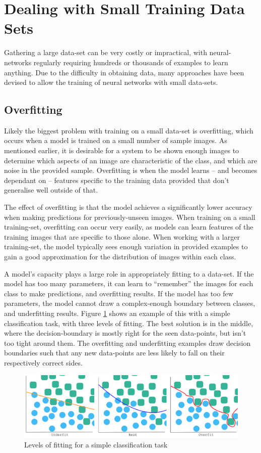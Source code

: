 \documentclass{report}
\begin{document}
	\section{Dealing with Small Training Data Sets}
	Gathering a large data-set can be very costly or impractical, with neural-networks regularly requiring hundreds or thousands of examples to learn anything. Due to the difficulty in obtaining data, many approaches have been devised to allow the training of neural networks with small data-sets. \par
	
	\subsection{Overfitting}
	Likely the biggest problem with training on a small data-set is overfitting, which occurs when a model is trained on a small number of sample images. As mentioned earlier, it is desirable for a system to be shown enough images to determine which aspects of an image are characteristic of the class, and which are noise in the provided sample. Overfitting is when the model learns -- and becomes dependant on -- features specific to the training data provided that don't generalise well outside of that. \par
	The effect of overfitting is that the model achieves a significantly lower accuracy when making predictions for previously-unseen images. When training on  a small training-set, overfitting can occur very easily, as models can learn features of the training images that are specific to those alone. When working with a larger training-set, the model typically sees enough variation in provided examples to gain a good approximation for the distribution of images within each class. \par 
	A model's capacity plays a large role in appropriately fitting to a data-set. If the model has too many parameters, it can learn to ``remember'' the images for each class to make predictions, and overfitting results. If the model has too few parameters, the model cannot draw a complex-enough boundary between classes, and underfitting results. Figure \ref{fig:fitting:1} shows an example of this with a simple classification task, with three levels of fitting. The best solution is in the middle, where the decision-boundary is mostly right for the seen data-points, but isn't too tight around them. The overfitting and underfitting examples draw decision boundaries such that any new data-points are less likely to fall on their respectively correct sides. \par
	\begin{figure}[!h]
		\centering
		\includegraphics[width=14cm]{fitting}
		\caption{Levels of fitting for a simple classification task}
		\label{fig:fitting:1}
	\end{figure}
\end{document}
